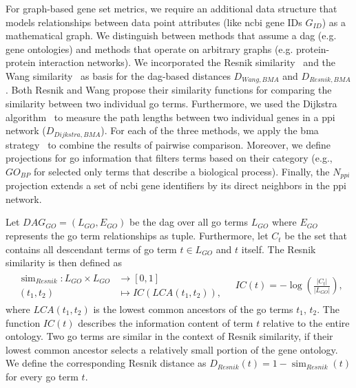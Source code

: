 \documentclass{thesisclass}
\DeclareMathOperator{\simOp}{sim}
\begin{document}

For graph-based gene set metrics, we require an additional data structure that models relationships between data point attributes (like \acrshort{ncbi} gene IDs $G_{ID}$) as a mathematical graph. 
We distinguish between methods that assume a \acrfull{dag} (e.g. gene ontologies) and methods that operate on arbitrary graphs (e.g. protein-protein interaction networks).
We incorporated the Resnik similarity~\cite{Resnik:1999:SST:3013545.3013547} and the Wang similarity~\cite{Wang:2007:NMM:1346066.1346071} as basis for the \acrshort{dag}-based distances $D_{Wang,BMA}$ and $D_{Resnik,BMA}$.
Both Resnik and Wang propose their similarity functions for comparing the similarity between two individual \acrshort{go} terms. Furthermore, we used the Dijkstra algorithm~\cite{Cormen:2009:IAT:1614191} to measure the path lengths between two individual genes in a \acrshort{ppi} network ($D_{Dijkstra, BMA}$). For each of the three methods, we apply the \acrfull{bma} strategy~\cite{Pesquita} to combine the results of pairwise comparison. Moreover, we define projections for \acrshort{go} information that filters terms based on their category (e.g., $GO_{BP}$ for selected only terms that describe a biological process). Finally, the $N_{ppi}$ projection extends a set of \acrshort{ncbi} gene identifiers by its direct neighbors in the \acrshort{ppi} network.

Let $DAG_{GO} = (L_{GO}, E_{GO})$ be the \acrshort{dag} over all \acrshort{go} terms $L_{GO}$ where $E_{GO}$ represents the \acrshort{go} term relationships as tuple.
Furthermore, let $C_t$ be the set that contains all descendant terms of \acrshort{go} term $t \in L_{GO}$ and $t$ itself. 
The Resnik similarity is then defined as
\begin{align*}
	\begin{split}
		\simOp_{Resnik} : L_{GO} \times L_{GO} & \to[0,1]\\
		(t_1, t_2) & \mapsto IC(LCA(t_1, t_2)),
	\end{split} 
	\quad IC(t) = - \log \left(  \frac{|C_t|}{|L_{GO}|} \right),
\end{align*}
where $LCA(t_1,t_2)$ is the lowest common ancestors of the \acrshort{go} terms $t_1$, $t_2$. 
The function $IC(t)$ describes the information content of term $t$ relative to the entire ontology. 
Two \acrshort{go} terms are similar in the context of Resnik similarity, if their lowest common ancestor selects a relatively small portion of the gene ontology. We define the corresponding Resnik distance as $D_{Resnik}(t) = 1- \simOp_{Resnik}(t)$ for every \acrfull{go} term $t$.
\end{document}
